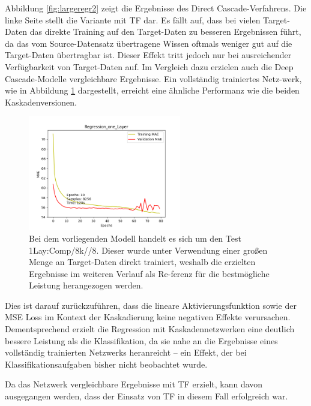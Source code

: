 Abbildung \ref{fig:largeregr2} zeigt die Ergebnisse des Direct Cascade-Verfahrens. Die linke Seite stellt die Variante mit TF dar. Es fällt auf, 
dass bei vielen Target-Daten das direkte Training auf den Target-Daten zu besseren Ergebnissen führt, da das vom Source-Datensatz 
übertragene Wissen oftmals weniger gut auf die Target-Daten übertragbar ist. Dieser Effekt tritt jedoch nur bei ausreichender Verfügbarkeit 
von Target-Daten auf. Im Vergleich dazu erzielen auch die Deep Cascade-Modelle vergleichbare Ergebnisse. Ein vollständig trainiertes Netz-werk, 
wie in Abbildung \ref{fig:largeregr2comp} dargestellt, erreicht eine ähnliche Performanz wie die beiden Kaskadenversionen.

\begin{figure}[htpb]
    \centering
    \includegraphics[height=5cm]{../../Plots/ba_plots/regression_large/onelayer_complete.png}
    \caption{\label{fig:largeregr2comp} 
    \small{Bei dem vorliegenden Modell handelt es sich um den Test 1Lay:Comp/8k//8. Dieser wurde unter Verwendung einer großen Menge an Target-Daten direkt 
    trainiert, weshalb die erzielten Ergebnisse im weiteren Verlauf als Re-ferenz für die bestmögliche Leistung herangezogen werden.}}
\end{figure}

Dies ist darauf zurückzuführen, dass die lineare Aktivierungsfunktion sowie der MSE Loss im Kontext der Kaskadierung keine 
negativen Effekte verursachen. Dementsprechend erzielt die Regression mit Kaskadennetzwerken eine deutlich bessere Leistung als die 
Klassifikation, da sie nahe an die Ergebnisse eines vollständig trainierten Netzwerks heranreicht – ein Effekt, der bei Klassifikationsaufgaben 
bisher nicht beobachtet wurde.

Da das Netzwerk vergleichbare Ergebnisse mit TF erzielt, kann davon ausgegangen werden, dass der Einsatz von TF in diesem Fall 
erfolgreich war.
